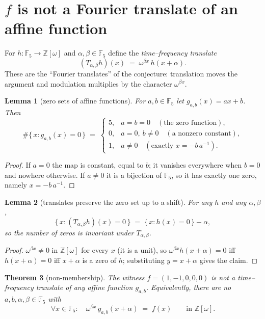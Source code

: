 \documentclass[11pt]{article}
\newtheorem{theorem}{Theorem}
\newtheorem{lemma}[theorem]{Lemma}
\theoremstyle{definition}
\theoremstyle{remark}
\newcommand{\F}{\mathbb{F}}
\newcommand{\Z}{\mathbb{Z}}
\begin{document}
\section{$f$ is not a Fourier translate of an affine function}

For $h:\F_5\to\Z[\omega]$ and $\alpha,\beta\in\F_5$ define the
\emph{time--frequency translate}
\begin{equation}\label{eq:tf}
(T_{\alpha,\beta}h)(x) \;=\; \omega^{\beta x}\,h(x+\alpha).
\end{equation}
These are the ``Fourier translates'' of the conjecture: translation moves the
argument and modulation multiplies by the character $\omega^{\beta x}$.

\begin{lemma}[zero sets of affine functions]\label{lem:zeros}
For $a,b\in\F_5$ let $g_{a,b}(x)=ax+b$. Then
\[
\#\{\,x : g_{a,b}(x)=0\,\} \;=\;
\begin{cases}
5, & a=b=0 \quad(\text{the zero function}),\\
0, & a=0,\ b\ne 0 \quad(\text{a nonzero constant}),\\
1, & a\ne 0 \quad(\text{exactly } x=-b\,a^{-1}).
\end{cases}
\]
\end{lemma}
\begin{proof}
If $a=0$ the map is constant, equal to $b$; it vanishes everywhere when
$b=0$ and nowhere otherwise. If $a\ne0$ it is a bijection of $\F_5$, so it has
exactly one zero, namely $x=-b\,a^{-1}$.
\end{proof}

\begin{lemma}[translates preserve the zero set up to a shift]\label{lem:zero-tf}
For any $h$ and any $\alpha,\beta$,
\[
\{\,x : (T_{\alpha,\beta}h)(x)=0\,\}
\;=\;
\{\,x : h(x)=0\,\}-\alpha ,
\]
so the number of zeros is invariant under $T_{\alpha,\beta}$.
\end{lemma}
\begin{proof}
$\omega^{\beta x}\ne0$ in $\Z[\omega]$ for every $x$ (it is a unit), so
$\omega^{\beta x}h(x+\alpha)=0$ iff $h(x+\alpha)=0$ iff $x+\alpha$ is a zero
of $h$; substituting $y=x+\alpha$ gives the claim.
\end{proof}

\begin{theorem}[non-membership]\label{thm:not-affine}
The witness $f=(1,-1,0,0,0)$ is not a time--frequency translate of any affine
function $g_{a,b}$. Equivalently, there are no
$a,b,\alpha,\beta\in\F_5$ with
\[
\forall x\in\F_5:\quad \omega^{\beta x}\,g_{a,b}(x+\alpha) \;=\; f(x)
\qquad\text{in }\Z[\omega].
\]
\end{theorem}
\end{document}
